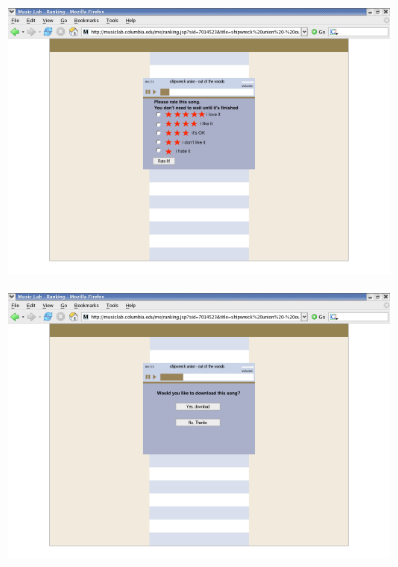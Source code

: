 \documentclass[aspectratio=169]{beamer}
\begin{document}
\begin{frame} 

\begin{figure}
  \centering
  \includegraphics[width = 0.9\textwidth]{figures/listenscreen}
\end{figure}

\end{frame}
\begin{frame}

\begin{figure}
  \centering
  \includegraphics[width = 0.9\textwidth]{figures/downloadscreen}
\end{figure}

\end{frame}
\end{document}
